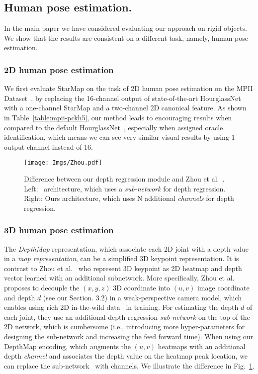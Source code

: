 \documentclass[runningheads]{llncs}
\begin{document}
\subsection{Human pose estimation.} 
In the main paper we have considered evaluating our approach on rigid objects. We show that the results are consistent on a different task, namely, human pose estimation. 

\subsubsection{2D human pose estimation}
We first evaluate StarMap on the task of 2D human pose estimation on the MPII Dataset~\cite{andriluka14cvpr}, by replacing the 16-channel output of state-of-the-art HourglassNet~\cite{newell2016stacked} with a one-channel StarMap and a two-channel 2D canonical feature. 
As shown in Table~\ref{table:mpii-pckh5}, our method leads to encouraging results when compared to the default HourglassNet~\cite{newell2016stacked}, especially when assigned oracle identification, which means we can see very similar visual results by using 1 output channel instead of 16.

\begin{figure}[t]
\centering
\texttt{[image: Imgs/Zhou.pdf]}
\caption{Difference between our depth regression module and Zhou et al.~\cite{Zhou_2017_ICCV}. Left:~\cite{Zhou_2017_ICCV} architecture, which uses a \emph{sub-network} for depth regression. Right: Ours architecture, which uses N additional \emph{channels} for depth regression.}
\label{fig:zhou}
\vspace{-0.3cm}
\end{figure}

\subsubsection{3D human pose estimation}
The \emph{DepthMap} representation, which associate each 2D joint with a depth value in a \emph{map representation}, 
can be a simplified 3D keypoint representation. 
It is contrast to Zhou et al.~\cite{Zhou_2017_ICCV} who represent 3D keypoint as 2D heatmap and depth vector learned with an additional subnetwork.
More specifically, Zhou et al.~\cite{Zhou_2017_ICCV} proposes to decouple the $(x, y, z)$ 3D coordinate into $(u, v)$ image coordinate and depth $d$ (see our Section. 3.2) in a weak-perspective camera model,
which enables using rich 2D in-the-wild data~\cite{andriluka14cvpr} in training. 
For estimating the depth $d$ of each joint, they use an additional depth regression \emph{sub-network} on the top of the 2D network, which is cumbersome (i.e., introducing more hyper-parameters for designing the sub-network and increasing the feed forward time). 
When using our DepthMap encoding, which augments the $(u, v)$ heatmaps with an additional depth \emph{channel} and associates the depth value on the heatmap peak location, 
we can replace the sub-network~\cite{Zhou_2017_ICCV} with channels.
We illustrate the difference in Fig.~\ref{fig:zhou}. 
\end{document}
